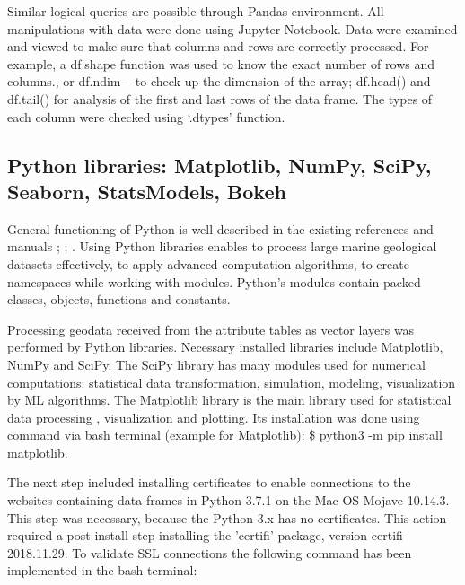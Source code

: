 \documentclass[11pt,a4paper]{report}
\begin{document}
{Similar logical queries are possible through Pandas environment. All manipulations with data were done using Jupyter Notebook. Data were examined and viewed to make sure that columns and rows are correctly processed. For example, a df.shape function was used to know the exact number of rows and columns., or df.ndim – to check up the dimension of the array; df.head() and df.tail() for analysis of the first and last rows of the data frame. The types of each column were checked using ‘.dtypes’ function.

\subsection{Python libraries: Matplotlib, NumPy, SciPy, Seaborn, StatsModels, Bokeh}\label{ssec:PyMpl01}
General functioning of Python is well described in the existing references and manuals \cite{Oliphant2007}; \cite{Pedregosaetal2011}; \cite{PerezGranger2007}. Using Python libraries enables to process large marine geological datasets effectively, to apply advanced computation algorithms,  to create namespaces while working with modules. Python’s modules contain packed classes, objects, functions and constants. 

Processing geodata received from the attribute tables as vector layers was performed by Python libraries. Necessary installed libraries include Matplotlib, \ac{NumPy} and \ac{SciPy}. The \ac{SciPy} library has many modules used for numerical computations: statistical data transformation, simulation, modeling, visualization by \ac{ML} algorithms. The Matplotlib library is the main library used for statistical data processing \cite{Hunter2007}, visualization and plotting. Its installation was done using command via \ac{bash} terminal (example for Matplotlib): \$ python3 -m pip install matplotlib. 

The next step included installing certificates to enable connections to the websites containing data frames in Python 3.7.1 on the Mac OS Mojave 10.14.3. This step was necessary, because the Python 3.x has no certificates. This action required a post-install step installing the 'certifi' package, version certifi-2018.11.29. To validate \ac{SSL} connections the following command has been implemented in the \ac{bash} terminal: 

}
\end{document}
